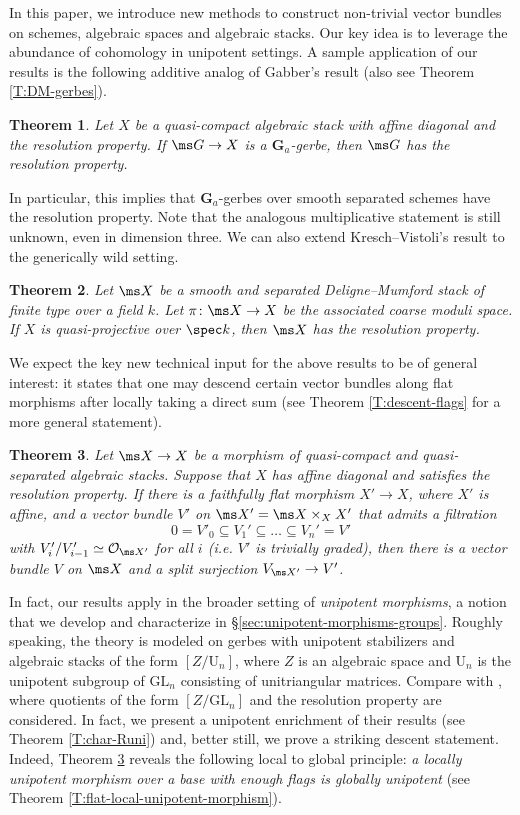 \documentclass[reqno,a4paper]{amsart}
\numberwithin{Theorem}{section}
\newcommand{\Orb}{\mathcal{O}}
\renewcommand{\GL}{\mathrm{GL}}
\renewcommand{\U}{\mathrm{U}}
\theoremstyle{plain}
\newtheorem{maintheorem}{Theorem}
\theoremstyle{remark}
\begin{document}
In this paper, we introduce new methods to construct non-trivial
vector bundles on schemes, algebraic spaces and algebraic stacks. Our
key idea is to 
leverage the abundance of cohomology in unipotent settings. A sample application of our results is the following additive
analog of Gabber's result (also see Theorem \ref{T:DM-gerbes}).
\begin{maintheorem}\label{MT:ga-gerbes-res}
  Let $X$ be a quasi-compact algebraic stack with affine diagonal and
  the resolution property. If $\ms G \to X$ is a $\mathbf{G}_{a}$-gerbe,
  then $\ms G$ has the resolution property.
\end{maintheorem}
In particular, this implies that $\mathbf{G}_a$-gerbes over smooth separated schemes have the resolution property. Note that the analogous multiplicative statement is still unknown, even in dimension three. We can also extend Kresch--Vistoli's result to the generically wild setting.
\begin{maintheorem}\label{MT:dm-stack-res}
  Let $\ms X$ be a smooth and separated Deligne--Mumford
  stack of finite type over a field $k$. Let $\pi \colon \ms X \to X$ be the associated
  coarse moduli space. If $X$ is
  quasi-projective over $\spec k$, then $\ms X$ has the resolution
  property.
\end{maintheorem}
We expect the key new technical input for the above results to be of
general interest: it states that one may descend certain vector
bundles along flat morphisms after locally taking a direct sum (see Theorem
\ref{T:descent-flags} for a more general statement).
\begin{maintheorem} \label{MT:flagbasic} Let $\ms X \to X$ be a
  morphism of quasi-compact and quasi-separated algebraic
  stacks. Suppose that $X$ has affine diagonal and satisfies the resolution property. If there
  is a faithfully flat morphism $X'\to X$, where $X'$ is affine, and a
  vector bundle $V'$ on $\ms X'= \ms X \times_X X'$ that admits a
  filtration
  \[
    0=V'_0 \subseteq V_1' \subseteq \dots \subseteq V_n'=V'
  \]
  with $V_{i}'/V_{i-1}'\simeq \Orb_{\ms X'}$ for all $i$ (i.e. $V'$ is \emph{trivially graded}), then there
  is a vector bundle $V$ on $\ms X$ and a split
  surjection $V_{\ms X'} \to V'$.
\end{maintheorem}

In fact, our results apply in the broader setting of \emph{unipotent
  morphisms}, a notion that we develop and characterize in
\S\ref{sec:unipotent-morphisms-groups}. Roughly speaking, the theory
is modeled on gerbes with unipotent stabilizers and algebraic stacks
of the form $[Z/\U_n]$, where $Z$ is an algebraic space and $\U_n$ is
the unipotent subgroup of $\GL_n$ consisting of unitriangular matrices. Compare with \cite{MR1844577,MR2108211,2013arXiv1306.5418G}, where quotients of the form $[Z/\GL_n]$ and the resolution property are considered. In fact, we present a unipotent enrichment of their results (see Theorem \ref{T:char-Runi}) and, better still, we prove a striking descent statement. Indeed, Theorem \ref{MT:flagbasic} reveals the following local to global principle: \emph{a locally unipotent morphism over a base with enough flags is globally unipotent} (see Theorem \ref{T:flat-local-unipotent-morphism}). 
\end{document}
